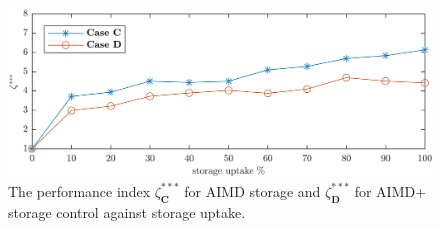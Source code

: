 \begin{figure}\centering
	\includegraphics{_chapter4/fig/storage-aimd-compare-par}
	\caption{The performance index $\zeta_\textbf{C}^{***}$ for AIMD storage and $\zeta_\textbf{D}^{***}$ for AIMD+ storage control against storage uptake.}
	\label{ch4:fig:storage-aimd-compare-par}
\end{figure}
